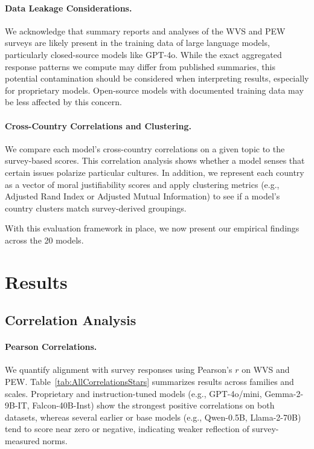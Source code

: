 \documentclass[a4paper,10pt,twoside]{article}
\newcommand{\tabref}[1]{Table~\ref{#1}}
\begin{document}
\paragraph{Data Leakage Considerations.}
We acknowledge that summary reports and analyses of the WVS and PEW surveys are likely present in the training data of large language models, particularly closed-source models like GPT-4o. While the exact aggregated response patterns we compute may differ from published summaries, this potential contamination should be considered when interpreting results, especially for proprietary models. Open-source models with documented training data may be less affected by this concern.

\paragraph{Cross-Country Correlations and Clustering.}
We compare each model's cross-country correlations on a given topic to the survey-based scores. This correlation analysis shows whether a model senses that certain issues polarize particular cultures. In addition, we represent each country as a vector of moral justifiability scores and apply clustering metrics (e.g., Adjusted Rand Index or Adjusted Mutual Information) to see if a model's country clusters match survey-derived groupings.

With this evaluation framework in place, we now present our empirical findings across the 20 models.

\section{Results}

\subsection{Correlation Analysis}

\paragraph{Pearson Correlations.}
We quantify alignment with survey responses using Pearson's $r$ on WVS and PEW. \tabref{tab:AllCorrelationsStars} summarizes results across families and scales. Proprietary and instruction-tuned models (e.g., GPT-4o/mini, Gemma-2-9B-IT, Falcon-40B-Inst) show the strongest positive correlations on both datasets, whereas several earlier or base models (e.g., Qwen-0.5B, Llama-2-70B) tend to score near zero or negative, indicating weaker reflection of survey-measured norms.
\end{document}
